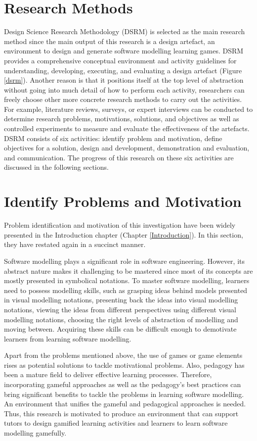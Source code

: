 \documentclass[12pt, a4paper]{report} \usepackage[titletoc]{appendix}
\begin{document}
\section{Research Methods}
\label{Research Methods}
Design Science Research Methodology (DSRM) is selected as the main research method since the main output of this research is a design artefact, an environment to design and generate software modelling learning games. DSRM provides a comprehensive conceptual environment and activity guidelines for understanding, developing, executing, and evaluating a design artefact (Figure \ref{dsrm}). Another reason is that it positions itself at the top level of abstraction without going into much detail of how to perform each activity, researchers can freely choose other more concrete research methods to carry out the activities. For example, literature reviews, surveys, or expert interviews can be conducted to determine research problems, motivations, solutions, and objectives as well as controlled experiments to measure and evaluate the effectiveness of the artefacts. DSRM consists of six activities: identify problem and motivation, define objectives for a solution, design and development, demonstration and evaluation, and communication. The progress of this research on these six activities are discussed in the following sections.

\section{Identify Problems and Motivation}
Problem identification and motivation of this investigation have been widely presented in the Introduction chapter (Chapter \ref{Introduction}). In this section, they have restated again in a succinct manner. 

Software modelling plays a significant role in software engineering. However, its abstract nature makes it challenging to be mastered since most of its concepts are mostly presented in symbolical notations. To master software modelling, learners need to possess modelling skills, such as grasping ideas behind models presented in visual modelling notations, presenting back the ideas into visual modelling notations, viewing the ideas from different perspectives using different visual modelling notations, choosing the right levels of abstraction of modelling and moving between. Acquiring these skills can be difficult enough to demotivate learners from learning software modelling.

Apart from the problems mentioned above, the use of games or game elements rises as potential solutions to tackle motivational problems. Also, pedagogy has been a mature field to deliver effective learning processes. Therefore, incorporating gameful approaches as well as the pedagogy's best practices can bring significant benefits to tackle the problems in learning software modelling. An environment that unifies the gameful and pedagogical approaches is needed.  Thus, this research is motivated to produce an environment that can support tutors to design gamified learning activities and learners to learn software modelling gamefully.
\end{document}

